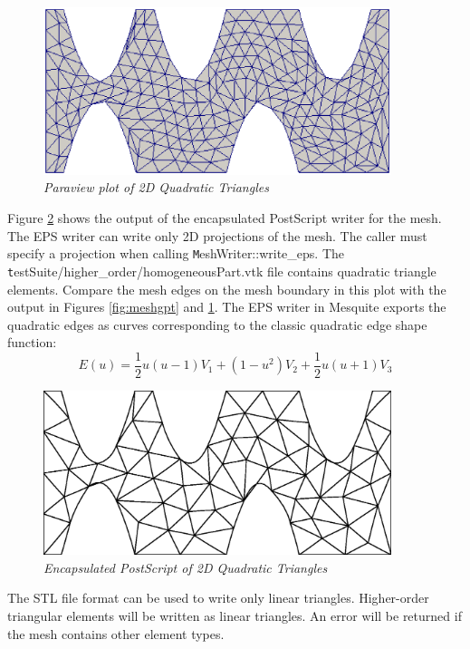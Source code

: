 \begin{figure}[htb!]
\begin{center}
\includegraphics[width=4in]{mesh_vtk}
\caption{\em Paraview plot of 2D Quadratic Triangles \label{fig:meshvtk}}
\end{center}
\end{figure}

Figure \ref{fig:mesh} shows the output of the encapsulated PostScript writer for the mesh.  The EPS writer can write only 2D projections of the mesh.  The caller must specify a projection when calling {\texttt MeshWriter::write\_eps}.  The {\texttt testSuite/higher\_order/homogeneousPart.vtk} file contains quadratic triangle elements.  Compare the mesh edges on the mesh boundary in this plot with the output in Figures \ref{fig:meshgpt} and \ref{fig:meshvtk}.	The EPS writer in Mesquite exports the quadratic edges as curves corresponding to the classic quadratic edge shape function:
\begin{displaymath}
E(u) = \frac{1}{2}u(u-1)V_1 + (1-u^2)V_2 + \frac{1}{2}u(u+1)V_3
\end{displaymath}

\begin{figure}[htb!]
\begin{center}
\includegraphics[width=4in]{mesh}
\caption{\em Encapsulated PostScript of 2D Quadratic Triangles \label{fig:mesh}}
\end{center}
\end{figure}

The STL file format can be used to write only linear triangles.	 Higher-order triangular elements will be written as linear triangles.	An error will be returned if the mesh contains other element types.

